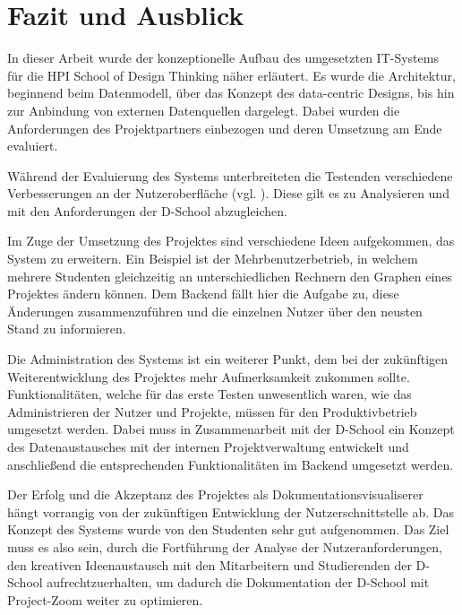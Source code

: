 \chapter{Fazit und Ausblick}
In dieser Arbeit wurde der konzeptionelle Aufbau des umgesetzten IT-Systems für die HPI School of Design Thinking näher erläutert. Es wurde die Architektur, beginnend beim Datenmodell, über das Konzept des data-centric Designs, bis hin zur Anbindung von externen Datenquellen dargelegt. Dabei wurden die Anforderungen des Projektpartners einbezogen und deren Umsetzung am Ende evaluiert.

Während der Evaluierung des Systems unterbreiteten die Testenden verschiedene Verbesserungen an der Nutzeroberfläche (vgl. \cite{bp-tomh}). Diese gilt es zu Analysieren und mit den Anforderungen der D-School abzugleichen.

Im Zuge der Umsetzung des Projektes sind verschiedene Ideen aufgekommen, das System zu erweitern. Ein Beispiel ist der Mehrbenutzerbetrieb, in welchem mehrere Studenten gleichzeitig an unterschiedlichen Rechnern den Graphen eines Projektes ändern können. Dem \gls{Backend} fällt hier die Aufgabe zu, diese Änderungen zusammenzuführen und die einzelnen Nutzer über den neusten Stand zu informieren.

Die Administration des Systems ist ein weiterer Punkt, dem bei der zukünftigen Weiterentwicklung des Projektes mehr Aufmerksamkeit zukommen sollte. Funktionalitäten, welche für das erste Testen unwesentlich waren, wie das Administrieren der Nutzer und Projekte, müssen für den Produktivbetrieb umgesetzt werden. Dabei muss in Zusammenarbeit mit der D-School ein Konzept des Datenaustausches mit der internen Projektverwaltung entwickelt und anschließend die entsprechenden Funktionalitäten im \gls{Backend} umgesetzt werden.

Der Erfolg und die Akzeptanz des Projektes als Dokumentationsvisualiserer hängt vorrangig von der zukünftigen Entwicklung der Nutzerschnittstelle ab. Das Konzept des Systems wurde von den Studenten sehr gut aufgenommen. Das Ziel muss es also sein, durch die Fortführung der Analyse der Nutzeranforderungen, den kreativen Ideenaustausch mit den Mitarbeitern und Studierenden der D-School aufrechtzuerhalten, um dadurch die Dokumentation der D-School mit Project-Zoom weiter zu optimieren.